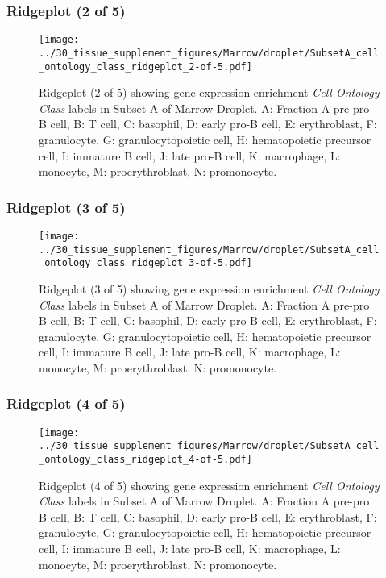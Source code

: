 \clearpage

\subsubsection{Ridgeplot (2 of 5)}
\begin{figure}[h]
\centering
\texttt{[image: ../30\_tissue\_supplement\_figures/Marrow/droplet/SubsetA\_cell\_ontology\_class\_ridgeplot\_2-of-5.pdf]}

\caption{ Ridgeplot (2 of 5)  showing gene expression enrichment \emph{Cell Ontology Class} labels in Subset A of Marrow Droplet. A: Fraction A pre-pro B cell, B: T cell, C: basophil, D: early pro-B cell, E: erythroblast, F: granulocyte, G: granulocytopoietic cell, H: hematopoietic precursor cell, I: immature B cell, J: late pro-B cell, K: macrophage, L: monocyte, M: proerythroblast, N: promonocyte.}
\end{figure}


\clearpage

\subsubsection{Ridgeplot (3 of 5)}
\begin{figure}[h]
\centering
\texttt{[image: ../30\_tissue\_supplement\_figures/Marrow/droplet/SubsetA\_cell\_ontology\_class\_ridgeplot\_3-of-5.pdf]}

\caption{ Ridgeplot (3 of 5)  showing gene expression enrichment \emph{Cell Ontology Class} labels in Subset A of Marrow Droplet. A: Fraction A pre-pro B cell, B: T cell, C: basophil, D: early pro-B cell, E: erythroblast, F: granulocyte, G: granulocytopoietic cell, H: hematopoietic precursor cell, I: immature B cell, J: late pro-B cell, K: macrophage, L: monocyte, M: proerythroblast, N: promonocyte.}
\end{figure}


\clearpage

\subsubsection{Ridgeplot (4 of 5)}
\begin{figure}[h]
\centering
\texttt{[image: ../30\_tissue\_supplement\_figures/Marrow/droplet/SubsetA\_cell\_ontology\_class\_ridgeplot\_4-of-5.pdf]}

\caption{ Ridgeplot (4 of 5)  showing gene expression enrichment \emph{Cell Ontology Class} labels in Subset A of Marrow Droplet. A: Fraction A pre-pro B cell, B: T cell, C: basophil, D: early pro-B cell, E: erythroblast, F: granulocyte, G: granulocytopoietic cell, H: hematopoietic precursor cell, I: immature B cell, J: late pro-B cell, K: macrophage, L: monocyte, M: proerythroblast, N: promonocyte.}
\end{figure}


